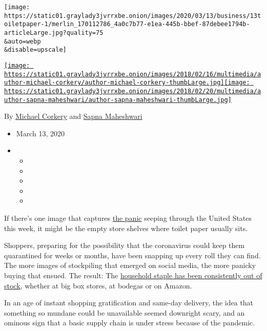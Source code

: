 \texttt{[image: https://static01.graylady3jvrrxbe.onion/images/2020/03/13/business/13toiletpaper-1/merlin\_170112786\_4a0c7b77-e1ea-445b-bbef-87debee1794b-articleLarge.jpg?quality=75\\\&auto=webp\\\&disable=upscale]}

\href{https://www.nytimes3xbfgragh.onion/by/michael-corkery}{\texttt{[image: https://static01.graylady3jvrrxbe.onion/images/2018/02/16/multimedia/author-michael-corkery/author-michael-corkery-thumbLarge.jpg]}}\href{https://www.nytimes3xbfgragh.onion/by/sapna-maheshwari}{\texttt{[image: https://static01.graylady3jvrrxbe.onion/images/2018/02/20/multimedia/author-sapna-maheshwari/author-sapna-maheshwari-thumbLarge.jpg]}}

By \href{https://www.nytimes3xbfgragh.onion/by/michael-corkery}{Michael
Corkery} and
\href{https://www.nytimes3xbfgragh.onion/by/sapna-maheshwari}{Sapna
Maheshwari}

\begin{itemize}
\item
  March 13, 2020
\item
  \begin{itemize}
  \item
  \item
  \item
  \item
  \item
  \end{itemize}
\end{itemize}

If there's one image that captures
\href{https://www.nytimes3xbfgragh.onion/2020/03/13/nyregion/coronavirus-panic-buying.html?action=click\&module=Top\%20Stories\&pgtype=Homepage}{the
panic} seeping through the United States this week, it might be the
empty store shelves where toilet paper usually sits.

Shoppers, preparing for the possibility that the coronavirus could keep
them quarantined for weeks or months, have been snapping up every roll
they can find. The more images of stockpiling that emerged on social
media, the more panicky buying that ensued. The result: The
\href{https://www.nytimes3xbfgragh.onion/2020/03/21/us/flushable-wipes-clog.html}{household
staple has been consistently out of stock}, whether at big box stores,
at bodegas or on Amazon.

In an age of instant shopping gratification and same-day delivery, the
idea that something so mundane could be unavailable seemed downright
scary, and an ominous sign that a basic supply chain is under stress
because of the pandemic.

